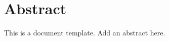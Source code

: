 
\chapter*{Abstract}
\label{cha:abstract}

This is a document template. Add an abstract here.

\newpage
